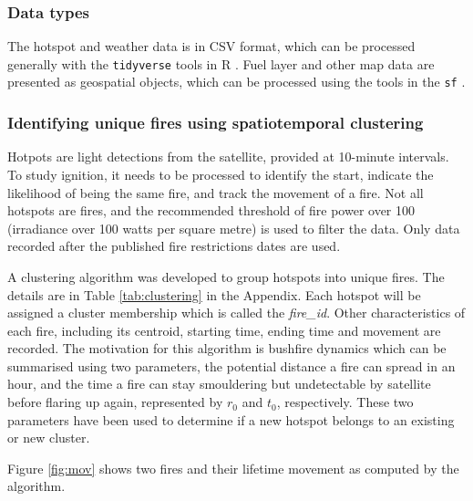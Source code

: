 \documentclass[11pt,a4paper,]{article}
\begin{document}
\hypertarget{data-types}{%
\subsubsection{Data types}\label{data-types}}

The hotspot and weather data is in CSV format, which can be processed generally with the \texttt{tidyverse} \autocite{R-tidyverse} tools in R \autocite{R}. Fuel layer and other map data are presented as geospatial objects, which can be processed using the tools in the \texttt{sf} \autocite{R-sf}.

\hypertarget{identifying-unique-fires-using-spatiotemporal-clustering}{%
\subsubsection{Identifying unique fires using spatiotemporal clustering}\label{identifying-unique-fires-using-spatiotemporal-clustering}}

Hotpots are light detections from the satellite, provided at 10-minute intervals. To study ignition, it needs to be processed to identify the start, indicate the likelihood of being the same fire, and track the movement of a fire. Not all hotspots are fires, and the recommended threshold of fire power over 100 (irradiance over 100 watts per square metre) is used to filter the data. Only data recorded after the published fire restrictions dates are used.

A clustering algorithm was developed to group hotspots into unique fires. The details are in Table \ref{tab:clustering} in the Appendix. Each hotspot will be assigned a cluster membership which is called the \emph{fire\_id}. Other characteristics of each fire, including its centroid, starting time, ending time and movement are recorded. The motivation for this algorithm is bushfire dynamics which can be summarised using two parameters, the potential distance a fire can spread in an hour, and the time a fire can stay smouldering but undetectable by satellite before flaring up again, represented by \(r_0\) and \(t_0\), respectively. These two parameters have been used to determine if a new hotspot belongs to an existing or new cluster.

Figure \ref{fig:mov} shows two fires and their lifetime movement as computed by the algorithm.
\end{document}
